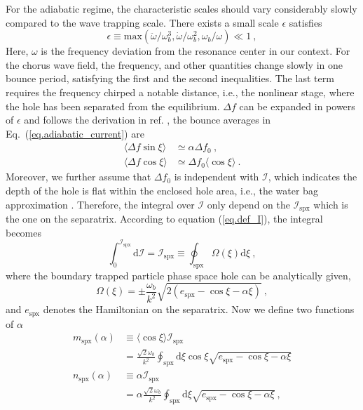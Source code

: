 For the adiabatic regime, the characteristic scales should vary considerably slowly compared to the wave trapping scale.
There exists a small scale $\epsilon$ satisfies \cite{berk1999}
\begin{equation}
    \epsilon \equiv \mathrm{max}\left(\ddot{\omega}/\omega_b^3, \dot{\omega}/\omega_b^2, \omega_b/\omega \right) \ll 1~,
\end{equation}
Here, $\omega$ is the frequency deviation from the resonance center in our context.
For the chorus wave field, the frequency, and other quantities change slowly in one bounce period, satisfying the first and the second inequalities. The last term requires the frequency chirped a notable distance, i.e., the nonlinear stage, where the hole has been separated from the equilibrium.
$\Delta f$ can be expanded in powers of $\epsilon$ and follows the derivation in ref. \cite{berk1999}, the bounce averages in Eq.~(\ref{eq.adiabatic_current}) are
\begin{equation}
    \begin{aligned}
    \langle\Delta f \sin \xi \rangle &\simeq \alpha \Delta f_0 ~, \\ 
    \langle \Delta f \cos \xi \rangle &\simeq  \Delta f_0 \langle \cos \xi \rangle ~.
    \end{aligned}
\end{equation}
Moreover, we further assume that $\Delta f_0$ is independent with $\mathcal{I}$, which indicates the depth of the hole is flat within the enclosed hole area, i.e., the water bag approximation \cite{omura_theory_2008,hezaveh2021}. 
Therefore, the integral over $\mathcal{I}$ only depend on the $\mathcal{I}_\mathrm{spx}$ which is the one on the separatrix. 
According to equation (\ref{eq.def_I}), the integral becomes
\begin{equation}
    \int^{\mathcal{I}_\mathrm{s p x}}_0 \mathrm{d}\mathcal{I} = \mathcal{I}_\mathrm{s p x} \equiv \oint_\mathrm{s p x} \Omega (\xi) \mathrm{d} \xi~,
\end{equation}
where the boundary trapped particle phase space hole can be analytically given,
\begin{equation}
    \Omega(\xi) = \pm \frac{\omega_b}{k^2} \sqrt{2 (e_\mathrm{spx}-\cos \xi - \alpha \xi)}~,
\end{equation}
and $e_\mathrm{spx}$ denotes the Hamiltonian on the separatrix.
Now we define two functions of $\alpha$
\begin{equation}\label{eq.function}
    \begin{aligned}
        m_\mathrm{spx}(\alpha) & \equiv \langle \cos \xi \rangle  \mathcal{I}_\mathrm{spx}
        \\
        &= \frac{\sqrt{2} \omega_b}{k^2} \oint_\mathrm{s p x} \mathrm{d} \xi \cos \xi \sqrt{e_\mathrm{s p x}-\cos \xi-\alpha \xi} 
        \\
        n_\mathrm{spx}(\alpha) & \equiv \alpha \mathcal{I}_\mathrm{spx} 
        \\
        & = \alpha \frac{\sqrt{2} \omega_b}{k^2} \oint_\mathrm{s p x} \mathrm{d} \xi \sqrt{e_\mathrm{s p x}-\cos \xi-\alpha \xi}~,
    \end{aligned}
\end{equation}
